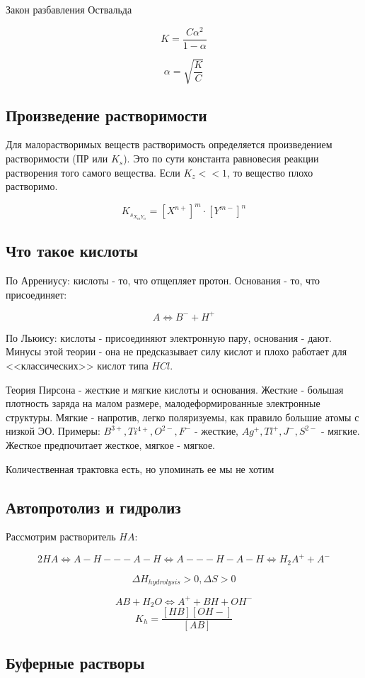 \documentclass[11pt]{article}
\begin{document}
Закон разбавления Оствальда 

$$K = \frac{C\alpha^2}{1-\alpha} $$

$$\alpha = \sqrt{\frac{K}{C}}$$

\subsection{Произведение растворимости}

Для малорастворимых веществ растворимость определяется произведением растворимости (ПР или $K_s$). Это по сути константа равновесия реакции растворения того самого вещества. Если $K_z <<1$, то вещество плохо растворимо.

$$K_{s_{X_mY_n}} = [X^{n+}]^m\cdot[Y^{m-}]^n$$

\subsection{Что такое кислоты}

По Аррениусу: кислоты - то, что отщепляет протон. Основания - то, что присоединяет:

$$A \Leftrightarrow B^- + H^+$$

По Льюису: кислоты - присоединяют электронную пару, основания - дают. Минусы этой теории - она не предсказывает силу кислот и плохо работает для <<классических>> кислот типа $HCl$. 

Теория Пирсона - жесткие и мягкие кислоты и основания. Жесткие - большая плотность заряда на малом размере, малодеформированные электронные структуры. Мягкие - напротив, легко поляризуемы, как правило большие атомы с низкой ЭО. Примеры: $B^{3+}, Ti^{4+}, O^{2-}, F^{-}$ - жесткие, $Ag^+, Tl^+, J^-, S^{2-}$ - мягкие. Жесткое предпочитает жесткое, мягкое - мягкое.

Количественная трактовка есть, но упоминать ее мы не хотим

\subsection{Автопротолиз и гидролиз}

Рассмотрим растворитель $HA$:

$$2HA \Leftrightarrow A-H---A-H \Leftrightarrow A---H-A-H \Leftrightarrow H_2A^+ + A^-$$


$$\Delta H_{hydrolysis}>0, \Delta S >0$$

$$AB + H_2O \Leftrightarrow A^+ + BH + OH^-$$
$$K_h = \frac{[HB][OH-]}{[AB]}$$

\subsection{Буферные растворы}
\end{document}
